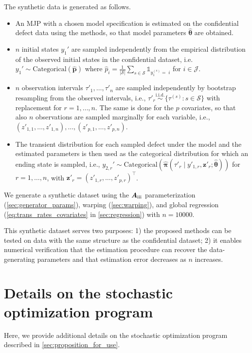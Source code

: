 \documentclass{article}
\newcommand{\RN}[1]{\textup{\uppercase\expandafter{\romannumeral#1}}}
\begin{document}
The synthetic data is generated as follows.
\begin{itemize}
\item An MJP with a chosen model specification is estimated on the confidential defect data using the methods, so that model parameters $\widehat{\bm \theta}$ are obtained.
\item $n$ initial states $y_1'$ are sampled independently from the empirical distribution of the observed initial states in the confidential dataset, i.e.
$
y_1' \sim \text{Categorical}(\widehat{\bm p})$ where $\widehat p_i = \frac{1}{| \mathcal S|} \sum_{s\in\mathcal S} \mathds{1}_{y_1^{(s)}=\;i}
$ for $i \in \mathcal J$. 
\item $n$ observation intervals $\tau'_1,\dots,\tau'_n$ are sampled independently by bootstrap resampling from the observed intervals, i.e.,
$
\tau'_r \overset{\text{i.i.d.}}{\sim} \{\tau^{(s)}: s\in\mathcal S\} $ with replacement for $ r=1,\dots,n$. The same is done for the $p$ covariates, so that also $n$ observations are sampled marginally for each variable, i.e., $(z'_{1,1},\dots,z'_{1,n} ), \dots, (z'_{p,1},\dots,z'_{p,n})$. 
\item The transient distribution for each sampled defect under the model and the estimated parameters is then used as the categorical distribution for which an ending state is sampled, i.e., 
$
y_{2,r}' \sim \text{Categorical}(\widehat{\bm\pi}( \tau'_r \mid y'_{1,r}, \bm z'_r; \widehat{\bm\theta}) )
$ for $r = 1, \dots, n$, with $\bm z'_r = (z'_{1,r},\dots,z'_{p,r})^\top$.
\end{itemize}
We generate a synthetic dataset using the $\bm{A}_{\RN{3}}$ parameterization (\cref{sec:generator_params}), warping (\cref{sec:warping}), and global regression (\cref{eq:trans_rates_covariates} in \cref{sec:regression}) with $n = 10000$.

This synthetic dataset serves two purposes: 1) the proposed methods can be tested on data with the same structure as the confidential dataset; 2) it enables numerical verification that the estimation procedure can recover the data-generating parameters and that estimation error decreases as $n$ increases.




\newpage

\section{Details on the stochastic optimization program} \label{sec:stochastic_optimization_details}
Here, we provide additional details on the stochastic optimization program described in \cref{sec:proposition_for_use}.
\end{document}
